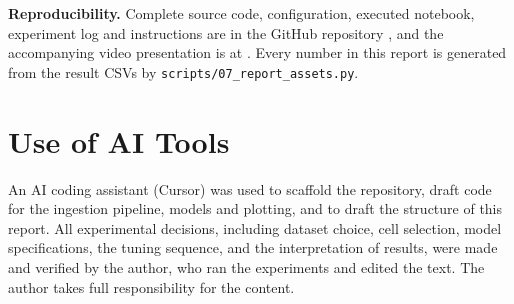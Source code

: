 \documentclass[conference,onecolumn,11pt]{IEEEtran}
\begin{document}
\textbf{Reproducibility.} Complete source code, configuration, executed notebook, experiment log and instructions are in the GitHub repository \cite{repo}, and the accompanying video presentation is at \cite{video}. Every number in this report is generated from the result CSVs by \texttt{scripts/07\_report\_assets.py}.

\section*{Use of AI Tools}
An AI coding assistant (Cursor) was used to scaffold the repository, draft code for the ingestion pipeline, models and plotting, and to draft the structure of this report. All experimental decisions, including dataset choice, cell selection, model specifications, the tuning sequence, and the interpretation of results, were made and verified by the author, who ran the experiments and edited the text. The author takes full responsibility for the content.



\end{document}
